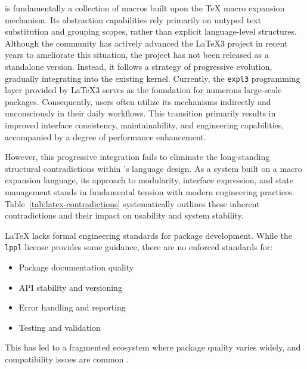 \LaTeXe{} is fundamentally a collection of macros built upon the \TeX{} macro expansion mechanism. Its abstraction capabilities rely primarily on untyped text substitution and grouping scopes, rather than explicit language-level structures. Although the community has actively advanced the \LaTeX3 project in recent years to ameliorate this situation, the project has not been released as a standalone version. Instead, it follows a strategy of progressive evolution, gradually integrating into the existing \LaTeXe{} kernel. Currently, the \texttt{expl3} programming layer provided by \LaTeX3 serves as the foundation for numerous large-scale packages. Consequently, users often utilize its mechanisms indirectly and unconsciously in their daily workflows. This transition primarily results in improved interface consistency, maintainability, and engineering capabilities, accompanied by a degree of performance enhancement.

However, this progressive integration fails to eliminate the long-standing structural contradictions within \LaTeXe{}'s language design. As a system built on a macro expansion language, its approach to modularity, interface expression, and state management stands in fundamental tension with modern engineering practices. Table~\ref{tab:latex-contradictions} systematically outlines these inherent contradictions and their impact on usability and system stability.

\LaTeX{} lacks formal engineering standards for package development. While the \texttt{lppl} license provides some guidance, there are no enforced standards for:

\begin{itemize}
    \item Package documentation quality
    \item API stability and versioning
    \item Error handling and reporting
    \item Testing and validation
\end{itemize}

This has led to a fragmented ecosystem where package quality varies widely, and compatibility issues are common \cite{interview2021}.

